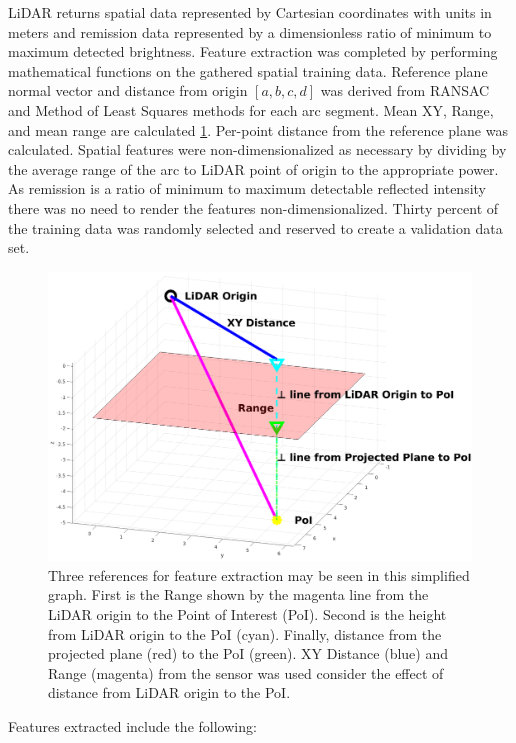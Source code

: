 \documentclass[numbered,pdftex]{ohio-etd}
\begin{document}
{{{{				{LiDAR returns spatial data represented by Cartesian coordinates with units in meters and remission data represented by a dimensionless ratio of minimum to maximum detected brightness. Feature extraction was completed by performing mathematical functions on the gathered spatial training data. Reference plane normal vector and distance from origin $[a,b,c,d]$ was derived from RANSAC and Method of Least Squares methods for each arc segment. Mean XY, Range, and mean range are calculated \ref{fig:xy_vs_range}. Per-point distance from the reference plane was calculated. Spatial features were non-dimensionalized as necessary by dividing by the average range of the arc to LiDAR point of origin to the appropriate power. As remission is a ratio of minimum to maximum detectable reflected intensity there was no need to render the features non-dimensionalized. Thirty percent of the training data was randomly selected and reserved to create a validation data set.}
				
				\begin{figure}[H]
					\centering
					\includegraphics[width=1\linewidth]{Defense_Images/xy_vs_range}
					\caption[XY vs Range vs Z Height]{Three references for feature extraction may be seen in this simplified graph. First is the Range shown by the magenta line from the LiDAR origin to the Point of Interest (PoI). Second is the height from  LiDAR origin to the PoI (cyan). Finally, distance from the projected plane (red) to the PoI (green). XY Distance (blue) and Range (magenta) from the sensor was used consider the effect of distance from LiDAR origin to the PoI.}
					\label{fig:xy_vs_range}
				\end{figure}
%				
				{Features extracted include the following:}

}}}}
\end{document}
